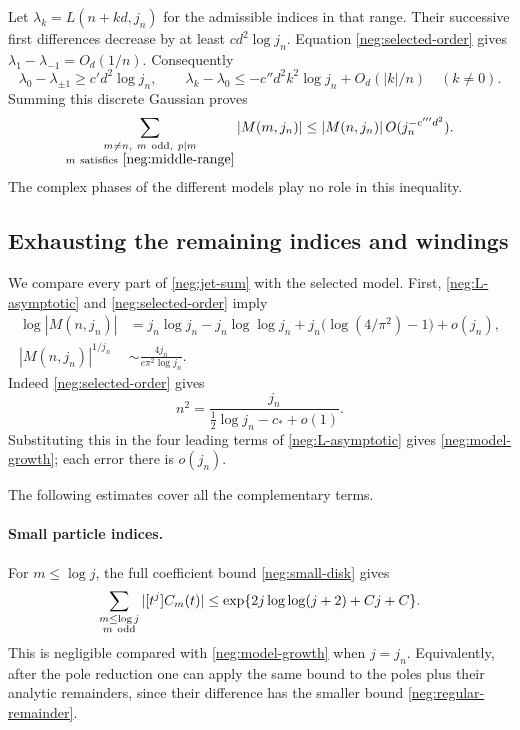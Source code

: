 \documentclass[11pt]{article}
\numberwithin{equation}{section}
\theoremstyle{definition}
\begin{document}
Let \(\lambda_k=L(n+kd,j_n)\) for the admissible indices
in that range.  Their successive first differences decrease
by at least \(c d^2\log j_n\).  Equation
\eqref{neg:selected-order} gives
\(\lambda_1-\lambda_{-1}=O_d(1/n)\).
Consequently
\[
 \lambda_0-\lambda_{\pm1}\ge c'd^2\log j_n,
 \qquad
 \lambda_k-\lambda_0
       \le-c''d^2 k^2\log j_n+O_d(|k|/n)\quad(k\ne0).
 \]
Summing this discrete Gaussian proves
\begin{equation}
 \sum_{\substack{m\ne n,\ m\ {\rm odd},\ p\mid m\\
                         m\ {\rm satisfies}\ \eqref{neg:middle-range}}}
       |M(m,j_n)|
 \le |M(n,j_n)|\,O(j_n^{-c'''d^2}).
 \label{neg:single-index}
\end{equation}
The complex phases of the different models play no role in
this inequality.

\subsection{Exhausting the remaining indices and windings}
\label{neg:exhaustion}

We compare every part of \eqref{neg:jet-sum} with the selected
model.  First, \eqref{neg:L-asymptotic} and
\eqref{neg:selected-order} imply
\begin{align}
 \log|M(n,j_n)|
 &=j_n\log j_n-j_n\log\log j_n
          +j_n\bigl(\log(4/\pi^2)-1\bigr)+o(j_n),
 \label{neg:model-growth}\\
 |M(n,j_n)|^{1/j_n}
 &\sim\frac{4j_n}{e\pi^2\log j_n}.
 \label{neg:model-root}
\end{align}
Indeed \eqref{neg:selected-order} gives
\[
 n^2=\frac{j_n}{\tfrac12\log j_n-c_*+o(1)}.
 \]
Substituting this in the four leading terms of
\eqref{neg:L-asymptotic} gives \eqref{neg:model-growth};
each error there is \(o(j_n)\).

The following estimates cover all the complementary terms.

\paragraph{Small particle indices.}
For \(m\le\log j\), the full coefficient bound
\eqref{neg:small-disk} gives
\begin{equation}
 \sum_{\substack{m\le\log j\\m\ {\rm odd}}}
       |[t^j]C_m(t)|
 \le \exp\{2j\log\log(j+2)+Cj+C\}.
 \label{neg:small-indices}
\end{equation}
This is negligible compared with \eqref{neg:model-growth}
when \(j=j_n\).  Equivalently, after the pole reduction one
can apply the same bound to the poles plus their analytic
remainders, since their difference has the smaller bound
\eqref{neg:regular-remainder}.
\end{document}

